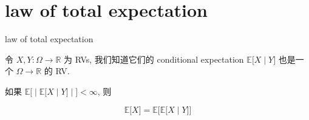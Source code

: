 \documentclass{qlnotes-export}
\begin{document}
\section{law of total expectation}\label{law-of-total-expectation}

\begin{theorem}{law of total expectation}\label{thm-03-joint-conditional-distribution-law-of-total-expectation}

令 \(X,Y:\Omega\rightarrow{\mathbb{R}}\) 为 RVs, 我们知道它们的 conditional expectation \(\left. {\mathbb{E}}\lbrack X \middle| Y\rbrack \right.\) 也是一个 \(\Omega\rightarrow{\mathbb{R}}\) 的 RV.

如果 \(\left. {\mathbb{E}}\lbrack \middle| {\mathbb{E}}\lbrack X \middle| Y\rbrack \middle| \rbrack < \infty \right.\), 则

\[\left. {\mathbb{E}}\lbrack X\rbrack = {\mathbb{E}}\lbrack{\mathbb{E}}\lbrack X \middle| Y\rbrack\rbrack \right.\]

\end{theorem}
\end{document}
